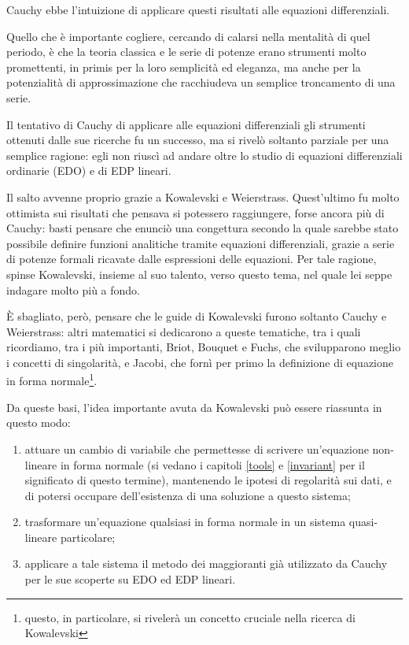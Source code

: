 Cauchy ebbe l'intuizione di applicare questi risultati alle equazioni differenziali. 

Quello che è importante cogliere, cercando di calarsi nella mentalità di quel periodo, è che la teoria classica e le serie di potenze erano strumenti molto promettenti, in primis per la loro semplicità ed eleganza, ma anche per la potenzialità di approssimazione che racchiudeva un semplice troncamento di una serie.

Il tentativo di Cauchy di applicare alle equazioni differenziali gli strumenti ottenuti dalle sue ricerche fu un successo, ma si rivelò soltanto parziale per una semplice ragione: egli non riuscì ad andare oltre lo studio di equazioni differenziali ordinarie (EDO) e di EDP lineari.

Il salto avvenne proprio grazie a Kowalevski e Weierstrass. Quest'ultimo fu molto ottimista sui risultati che pensava si potessero raggiungere, forse ancora più di Cauchy: basti pensare che enunciò una congettura secondo la quale sarebbe stato possibile definire funzioni analitiche tramite equazioni differenziali, grazie a serie di potenze formali ricavate dalle espressioni delle equazioni.
Per tale ragione, spinse Kowalevski, insieme al suo talento, verso questo tema, nel quale lei seppe indagare molto più a fondo.

È sbagliato, però, pensare che le guide di Kowalevski furono soltanto Cauchy e Weierstrass: altri matematici si dedicarono a queste tematiche, tra i quali ricordiamo, tra i più importanti, Briot, Bouquet e Fuchs, che svilupparono meglio i concetti di singolarità, e Jacobi, che fornì per primo la definizione di equazione in forma normale\footnote{questo, in particolare, si rivelerà un concetto cruciale nella ricerca di Kowalevski}.

Da queste basi, l’idea importante avuta da Kowalevski può essere riassunta in questo modo: 
\begin{enumerate}
\item attuare un cambio di variabile che permettesse di scrivere un'equazione non-lineare in forma normale (si vedano i capitoli \ref{tools} e \ref{invariant} per il significato di questo termine), mantenendo le ipotesi di regolarità sui dati, e di potersi occupare dell’esistenza di una soluzione a questo sistema;
\item trasformare un'equazione qualsiasi in forma normale in un sistema quasi-lineare particolare;
\item applicare a tale sistema il metodo dei maggioranti già utilizzato da Cauchy per le sue scoperte su EDO ed EDP lineari.
\end{enumerate}

